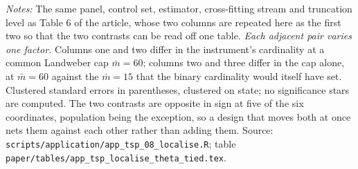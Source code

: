 \documentclass[
  12pt]{article}
\newcommand{\1}[1]{\mathds{1}\left[#1\right]}
\theoremstyle{plain}
\theoremstyle{definition}
\theoremstyle{definition}
\theoremstyle{remark}
\begin{document}
\begin{table}[!htbp]
\centering
\begin{threeparttable}
\caption{The iteration cap, held fixed and then varied}
\label{tab:app-theta-cap}
\footnotesize

\begin{tablenotes}\footnotesize
\item \textit{Notes:} The same panel, control set, estimator, cross-fitting
stream and truncation level as Table 6 of the article, whose two columns are
repeated here as the first two so that the two contrasts can be read off one
table. \emph{Each adjacent pair varies one factor.} Columns one and two differ in
the instrument's cardinality at a common Landweber cap $\bar m=60$; columns two
and three differ in the cap alone, at $\bar m=60$ against the $\bar m=15$ that
the binary cardinality would itself have set. Clustered standard errors in
parentheses, clustered on state; no significance stars are computed. The
two contrasts are opposite in sign at five of the six coordinates, population
being the exception, so a design that moves both at once nets them
against each other rather than adding them.
Source: \texttt{scripts/application/app\_tsp\_08\_localise.R}; table
\texttt{paper/tables/app\_tsp\_localise\_theta\_tied.tex}.
\end{tablenotes}
\end{threeparttable}
\end{table}
\end{document}
